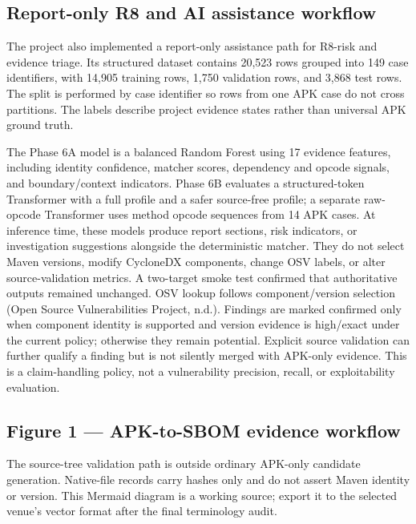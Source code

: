 \documentclass[10pt,twocolumn]{article}
\begin{document}
\subsection{Report-only R8 and AI assistance workflow}
The project also implemented a report-only assistance path for R8-risk and evidence triage. Its structured dataset contains 20,523 rows grouped into 149 case identifiers, with 14,905 training rows, 1,750 validation rows, and 3,868 test rows. The split is performed by case identifier so rows from one APK case do not cross partitions. The labels describe project evidence states rather than universal APK ground truth.

The Phase 6A model is a balanced Random Forest using 17 evidence features, including identity confidence, matcher scores, dependency and opcode signals, and boundary/context indicators. Phase 6B evaluates a structured-token Transformer with a full profile and a safer source-free profile; a separate raw-opcode Transformer uses method opcode sequences from 14 APK cases. At inference time, these models produce report sections, risk indicators, or investigation suggestions alongside the deterministic matcher. They do not select Maven versions, modify CycloneDX components, change OSV labels, or alter source-validation metrics. A two-target smoke test confirmed that authoritative outputs remained unchanged.
OSV lookup follows component/version selection (Open Source Vulnerabilities Project, n.d.). Findings are marked confirmed only when component identity is supported and version evidence is high/exact under the current policy; otherwise they remain potential. Explicit source validation can further qualify a finding but is not silently merged with APK-only evidence. This is a claim-handling policy, not a vulnerability precision, recall, or exploitability evaluation.
\subsection{Figure 1 — APK-to-SBOM evidence workflow}
\begin{center}\end{center}
The source-tree validation path is outside ordinary APK-only candidate generation. Native-file records carry hashes only and do not assert Maven identity or version. This Mermaid diagram is a working source; export it to the selected venue's vector format after the final terminology audit.
\end{document}
